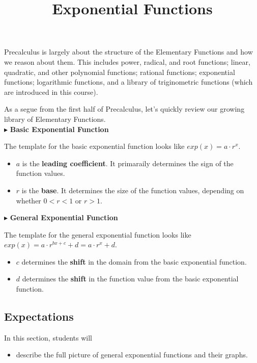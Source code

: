 \documentclass{ximera}
\title{Exponential Functions}
\begin{document}
\begin{abstract}
\end{abstract}
\maketitle




Precalculus is largely about the structure of the Elementary Functions and how we reason about them.  This includes power, radical, and root functions; linear, quadratic, and other polynomial functions; rational functions; exponential functions; logarithmic functions, and a library of triginometric functions (which are introduced in this course).

As a segue from the first half of Precalculus, let's quickly review our growing library of Elementary Functions. \\





$\blacktriangleright$ \textbf{Basic Exponential Function}


The template for the basic exponential function looks like $exp(x) = a \cdot r^x$. 

\begin{itemize}
\item $a$ is the \textbf{\textcolor{purple!85!blue}{leading coefficient}}.  It primaraily determines the sign of the function values.
\item $r$ is the \textbf{\textcolor{purple!85!blue}{base}}. It determines the size of the function values, depending on whether $0 < r < 1$ or $r > 1$.
\end{itemize}





$\blacktriangleright$ \textbf{General Exponential Function}

The template for the general exponential function looks like $exp(x) = a \cdot r^{b x + c} + d = a \cdot r^x + d$. 

\begin{itemize}
\item $c$ determines the \textbf{\textcolor{purple!85!blue}{shift}} in the domain from the basic exponential function.  
\item $d$ determines the \textbf{\textcolor{purple!85!blue}{shift}} in the function value from the basic exponential function. 
\end{itemize}









\subsection{Expectations}


\begin{sectionOutcomes}
In this section, students will 

\begin{itemize}
\item describe the full picture of general exponential functions and their graphs.
\end{itemize}
\end{sectionOutcomes}
\end{document}
